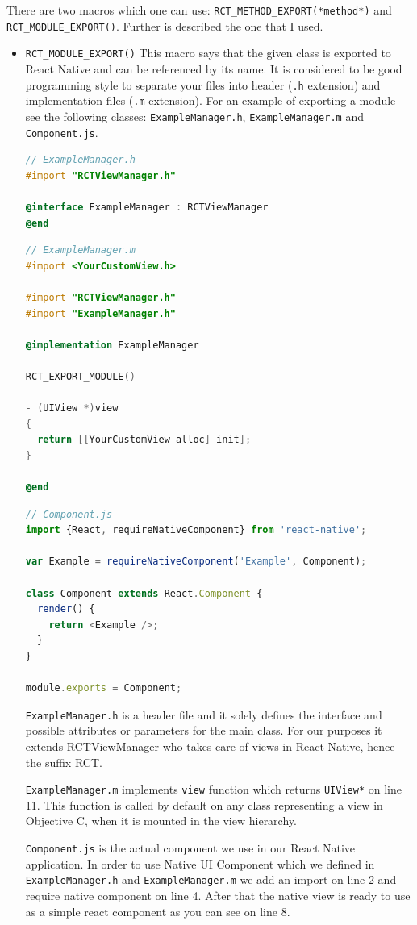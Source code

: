 \documentclass[thesis=M,english]{FITthesis}[2012/10/20]
\begin{document}
There are two macros which one can use:  \verb|RCT_METHOD_EXPORT(*method*)| and \verb|RCT_MODULE_EXPORT()|. Further is described the one that I used.

\begin{itemize}
\item  \verb|RCT_MODULE_EXPORT()| 
This macro says that the given class is exported to React Native and can be referenced by its name. It is considered to be good programming style to separate your files into header (\verb|.h| extension) and implementation files (\verb|.m| extension). For an example of exporting a module see the following classes: \verb|ExampleManager.h|, \verb|ExampleManager.m| and \verb|Component.js|.


\begin{lstlisting}[language=C]
// ExampleManager.h
#import "RCTViewManager.h"

@interface ExampleManager : RCTViewManager
@end

\end{lstlisting}

\begin{lstlisting}[language=C]
// ExampleManager.m
#import <YourCustomView.h>

#import "RCTViewManager.h"
#import "ExampleManager.h"

@implementation ExampleManager

RCT_EXPORT_MODULE()

- (UIView *)view
{
  return [[YourCustomView alloc] init];
}

@end
\end{lstlisting}

\begin{lstlisting}[language=javascript]
// Component.js
import {React, requireNativeComponent} from 'react-native';

var Example = requireNativeComponent('Example', Component);

class Component extends React.Component {
  render() {
    return <Example />;
  }
}

module.exports = Component;
\end{lstlisting}
  
  \verb|ExampleManager.h| is a header file and it solely defines the interface and possible attributes or parameters for the main class. For our purposes it extends RCTViewManager who takes care of views in React Native, hence the suffix RCT.
  
  \verb|ExampleManager.m| implements \verb|view| function which returns \verb|UIView*| on line 11. This function is called by default on any class representing a view in Objective C, when it is mounted in the view hierarchy.
  
  \verb|Component.js| is the actual component we use in our React Native application. In order to use Native UI Component which we defined in  \verb|ExampleManager.h| and \verb|ExampleManager.m| we add an import on line 2 and require native component on line 4. After that the native view is ready to use as a simple react component as you can see on line 8.
  

\end{itemize}
\end{document}
